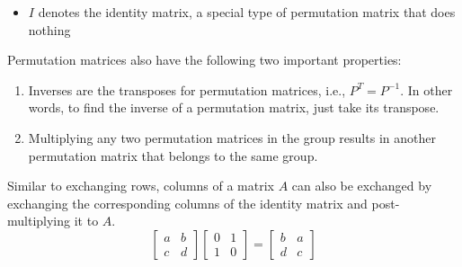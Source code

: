 \documentclass[../main.tex]{subfiles}
\begin{document}
{\begin{itemize}
\item $I$ denotes the identity matrix, a special type of permutation matrix that does nothing
\end{itemize}
Permutation matrices also have the following two important properties:
\begin{enumerate}[label = Property \arabic*., itemindent = *]
\item Inverses are the transposes for permutation matrices, i.e., $P^{T} = P^{-1}$. In other words, to find the inverse of a permutation matrix, just take its transpose.
\item Multiplying any two permutation matrices in the group results in another permutation matrix that belongs to the same group.
\end{enumerate}
Similar to exchanging rows, columns of a matrix $A$ can also be exchanged by exchanging the corresponding columns of the identity matrix and post-multiplying it to $A$. 
\[
\begin{bmatrix}
a & b \\
c & d 
\end{bmatrix}
\begin{bmatrix}
0 & 1 \\
1 & 0
\end{bmatrix}
=
\begin{bmatrix}
b & a \\
d & c
\end{bmatrix}
\]
}

\onlyinsubfile{\end{multicols*}}
\end{document}
